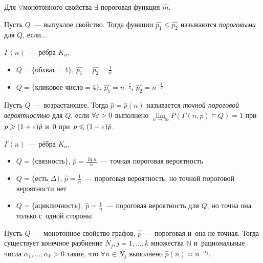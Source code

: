 \documentclass{article}
\begin{document}
\begin{corollary}
	Для $\forall$монотонного свойства $\exists$ пороговая функция $\hat{m}$.
\end{corollary}

\begin{definition}
	Пусть $Q$~--- выпуклое свойство. Тогда функции $\hat{p_1} \le \hat{p_2}$
	называются \emph{пороговыми} для $Q$, если...
\end{definition}

\begin{example}
	$\Gamma(n)$~--- рёбра $K_n$.
	\begin{itemize}
		\item $Q = \{\text{обхват} = 4\}$, $\hat{p_1} = \hat{p_2} = \frac{1}{n}$
		\item $Q = \{\text{кликовое число}  = 4\}$, $\hat{p_1} = n^{-\frac{2}{3}}$,
			$\hat{p_2} = n^{-\frac{1}{2}}$
	\end{itemize}
\end{example}

\begin{definition}
	Пусть $Q$~--- возрастающее. Тогда $\hat{p} = \hat{p}(n)$ называется
	\emph{точной пороговой вероятностью} для $Q$, если $\forall \varepsilon > 0$
	выполнено $\lim\limits_{n\rightarrow\infty} P(\Gamma(n, p) \models Q) = 1$ при
	$p \geqslant (1 + \varepsilon) \hat{p}$ и~0 при~$p \leqslant (1 - \varepsilon)\hat{p}$.
\end{definition}

\begin{example}
	$\Gamma(n)$~--- рёбра $K_n$.
	\begin{itemize}
		\item $Q = \{\text{связность}\}$, $\hat{p} = \frac{\ln n}{n}$~--- точная
			пороговая вероятность
		\item $Q = \{\text{есть } \Delta\}$, $\hat{p} = \frac{1}{n}$~--- пороговая
			вероятность, но точной пороговой вероятности нет
		\item $Q = \{\text{ацикличность}\}$, $\hat{p} = \frac{1}{n}$~--- пороговая
			вероятность для $Q$, но точна она только с~одной стороны
	\end{itemize}
\end{example}

\begin{theorem}[Фридгут]
	Пусть $Q$~--- монотонное свойство графов, $\hat{p}$~--- пороговая и~она не
	точная. Тогда существует конечное разбиение $N_j, j = 1, \ldots, k$ множества
	$\mathbb{N}$ и~рациональные числа $\alpha_1, \ldots, \alpha_k > 0$ такие, что
	$\forall n \in N_j$ выполнено $\hat{p}(n) \asymp n^{-\alpha_j}$.
\end{theorem}
\end{document}
